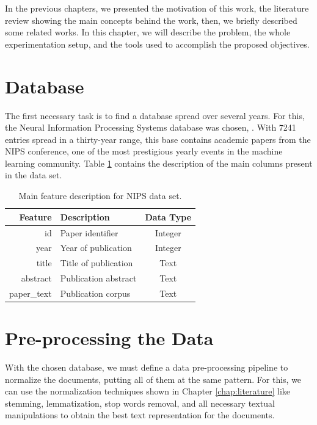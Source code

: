 In the previous chapters, we presented the motivation of this work, the literature review showing the main concepts behind the work, then, we briefly described some related works. In this chapter, we will describe the problem, the whole experimentation setup, and the tools used to accomplish the proposed objectives.

\section{Database}

The first necessary task is to find a database spread over several years. For this, the Neural Information Processing Systems database was chosen, \cite{nipsweb}. With 7241 entries spread in a thirty-year range, this base contains academic papers from the NIPS conference, one of the most prestigious yearly events in the machine learning community. Table \ref{tab:dataset-description} contains the description of the main columns present in the data set.

\begin{table}[h!]
	\centering
	\caption{Main feature description for NIPS data set.}
	\label{tab:dataset-description}
	\begin{tabular}{r|lc}
		\toprule
		    Feature & Description          & Data Type \\ \midrule
		         id & Paper identifier     &  Integer  \\
		       year & Year of publication  &  Integer  \\
		      title & Title of publication &   Text    \\
		   abstract & Publication abstract &   Text    \\
		paper\_text & Publication corpus   &   Text	   \\ \bottomrule
	\end{tabular}
\end{table}

\section{Pre-processing the Data}

With the chosen database, we must define a data pre-processing pipeline to normalize the documents, putting all of them at the same pattern. For this, we can use the normalization techniques shown in Chapter \ref{chap:literature} like stemming, lemmatization, stop words removal, and all necessary textual manipulations to obtain the best text representation for the documents.

